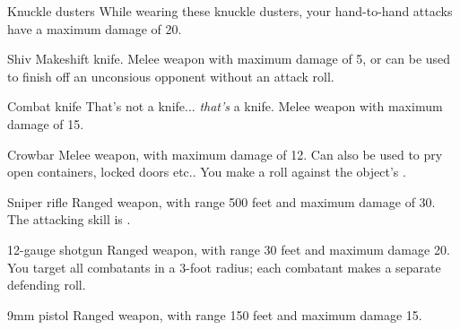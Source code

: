 
\begin{describe}{Knuckle dusters}
  While wearing these knuckle dusters, your hand-to-hand attacks have a maximum damage of 20.
\end{describe}

\begin{describe}{Shiv}
  Makeshift knife. Melee weapon with maximum damage of 5, or can be used to finish off an unconsious opponent without an attack roll.
\end{describe}

\begin{describe}{Combat knife}
  That's not a knife... \emph{that's} a knife. Melee weapon with maximum damage of 15.
\end{describe}

\begin{describe}{Crowbar}
  Melee weapon, with maximum damage of 12. Can also be used to pry open containers, locked doors etc.. You make a  roll against the object's .
\end{describe}

\begin{describe}{Sniper rifle}
  Ranged weapon, with range 500 feet and maximum damage of 30. The attacking skill is .
\end{describe}

\begin{describe}{12-gauge shotgun}
  Ranged weapon, with range 30 feet and maximum damage 20. You target all combatants in a 3-foot radius; each combatant makes a separate defending roll.
\end{describe}

\begin{describe}{9mm pistol}
  Ranged weapon, with range 150 feet and maximum damage 15.
\end{describe}

